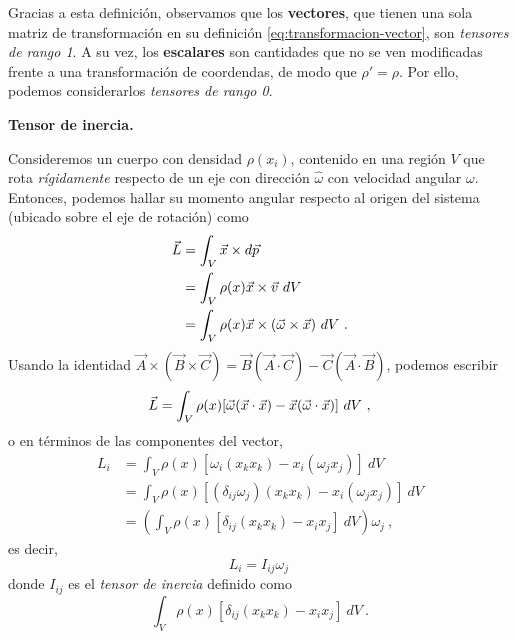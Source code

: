 Gracias a esta definición, observamos que los \textbf{vectores}, que tienen una sola matriz de transformación en su definición \eqref{eq:transformacion-vector}, son \emph{tensores de rango 1}. A su vez, los \textbf{escalares} son cantidades que no se ven modificadas frente a una transformación de coordendas, de modo que $\rho' = \rho$. Por ello, podemos considerarlos \emph{tensores de rango 0}.

\begin{ejemplo}
    \textbf{Tensor de inercia.}

    Consideremos un cuerpo con densidad $\rho(x_i)$, contenido en una región $V$ que rota \emph{rígidamente} respecto de un eje con dirección $\hat{\omega}$ con velocidad angular $\omega$. Entonces, podemos hallar su momento angular respecto al origen del sistema (ubicado sobre el eje de rotación) como
    \begin{align*}
        \vec{L} & = \int_V \x \times d\vec{p} \\
        & = \int_V \rho(x) \x \times \vec{v} \ dV \\
        & = \int_V \rho(x) \x \times (\vec{\omega} \times \x) \ dV \ .
    \end{align*}
    Usando la identidad $\vec{A} \times (\vec{B} \times \vec{C}) = \vec{B} (\vec{A} \cdot \vec{C}) - \vec{C} (\vec{A} \cdot \vec{B})$, podemos escribir
    \begin{equation*}
        \vec{L} = \int_V \rho(x) [\vec{\omega}(\x \cdot \x) - \x (\vec{\omega} \cdot \x)] \ dV \ ,
    \end{equation*}
    o en términos de las componentes del vector,
    \begin{align*}
        L_i & = \int_V \rho(x) [\omega_i(x_k x_k) - x_i(\omega_j x_j)] \ dV \\
        & = \int_V \rho(x) [(\delta_{ij} \omega_j)(x_k x_k) - x_i(\omega_j x_j)] \ dV \\
        & = \left( \int_V \rho(x) [\delta_{ij} (x_k x_k) - x_i x_j] \ dV \right) \omega_j \ ,
    \end{align*}
    es decir, 
    \begin{equation*}
        L_i = I_{ij} \omega_j \, 
    \end{equation*}
    donde $I_{ij}$ es el \emph{tensor de inercia} definido como
    \begin{equation*}
        \int_V \rho(x) [\delta_{ij} (x_k x_k) - x_i x_j] \ dV \ .
    \end{equation*}


\end{ejemplo}
